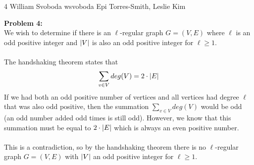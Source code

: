 \documentclass[12pt,letterpaper]{cos340hw}
\begin{document}
           {4}            %
           {William Svoboda}  %
           {wsvoboda}   %
           {Epi Torres-Smith, Leslie Kim} 




\noindent\textbf{Problem 4:}\\
We wish to determine if there is an $\ell$-regular graph $G=(V,E)$ where $\ell$ is an odd positive integer 
and $\left| V \right|$ is also an odd positive integer for $\ell \ge 1$.\\\\
The handshaking theorem states that 
$$\sum_{v\in V}deg(V)=2\cdot \left| E \right|$$
If we had both an odd positive number of vertices and all vertices had degree $\ell$ that was also 
odd positive, then the summation $\sum_{v\in V}deg(V)$ would be odd (an odd number added 
odd times is still odd). However, we know that this summation must be equal to $2\cdot \left| E \right|$ which 
is always an even positive number.\\\\
This is a contradiction, so by the handshaking theorem there is no $\ell$-regular graph $G=(V,E)$ with 
$\left| V \right|$ an odd positive integer for $\ell \ge 1$.


\end{document}
